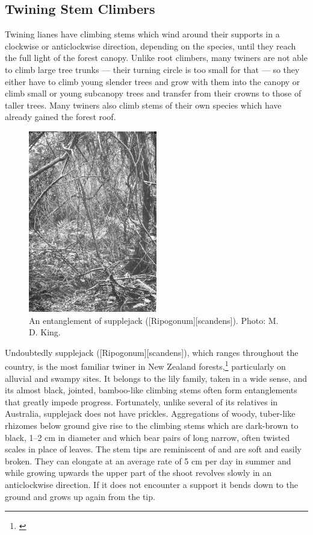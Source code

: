 \subsection{Twining Stem Climbers}

Twining lianes have climbing stems which wind around their supports in a clockwise or anticlockwise direction, depending on the species, until they reach the full light of the forest canopy.
Unlike root climbers, many twiners are not able to climb large tree trunks --- their turning circle is too small for that --- so they either have to climb young slender trees and grow with them into the canopy or climb small or young subcanopy trees and transfer from their crowns to those of taller trees.
Many twiners also climb stems of their own species which have already gained the forest roof.

\begin{figure}
	\includegraphics[width=0.5\textwidth]{graphics/figure33supplejack.jpg}
	\centering
	\caption[An entanglement of supplejack]{An entanglement of supplejack ([Ripogonum][scandens]). Photo:  M. D. King.}%
	\label{fig:33supplejack}
\end{figure}

Undoubtedly supplejack ([Ripogonum][scandens]), which ranges throughout the country, is the most familiar twiner in New Zealand forests,\footnote{\cite{macmillan1973biological}} particularly on alluvial and swampy sites.
It belongs to the lily family, taken in a wide sense, and its almost black, jointed, bamboo-like climbing stems often form entanglements that greatly impede progress.
Fortunately, unlike several of its relatives in Australia, supplejack does not have prickles.
Aggregations of woody, tuber-like rhizomes below ground give rise to the climbing stems which are dark-brown to black, 1--2 cm in diameter and which bear pairs of long narrow, often twisted scales in place of leaves.
The stem tips are reminiscent of  and are soft and easily broken.
They can elongate at an average rate of 5 cm per day in summer and while growing upwards the upper part of the shoot revolves slowly in an anticlockwise direction.
If it does not encounter a support it bends down to the ground and grows up again from the tip.

